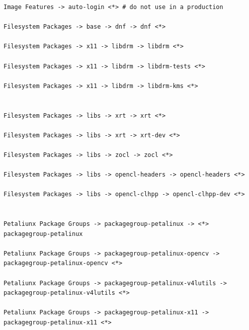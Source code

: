 \documentclass[a4paper, twoside, 11pt]{article}
\newcommand{\fbar}{\FloatBarrier}
\begin{document}
\begin{lstlisting}[language={Text}, caption={Doporučené nastavení rootfs pro akcelerovanou aplikaci.}, label= {lst:petalinux-config-c-rootfs-settings}]
Image Features -> auto-login <*> # do not use in a production

Filesystem Packages -> base -> dnf -> dnf <*>

Filesystem Packages -> x11 -> libdrm -> libdrm <*>

Filesystem Packages -> x11 -> libdrm -> libdrm-tests <*>

Filesystem Packages -> x11 -> libdrm -> libdrm-kms <*>


Filesystem Packages -> libs -> xrt -> xrt <*>

Filesystem Packages -> libs -> xrt -> xrt-dev <*>

Filesystem Packages -> libs -> zocl -> zocl <*>

Filesystem Packages -> libs -> opencl-headers -> opencl-headers <*>

Filesystem Packages -> libs -> opencl-clhpp -> opencl-clhpp-dev <*>


Petaliunx Package Groups -> packagegroup-petalinux -> <*> packagegroup-petalinux

Petaliunx Package Groups -> packagegroup-petalinux-opencv -> packagegroup-petalinux-opencv <*>

Petaliunx Package Groups -> packagegroup-petalinux-v4lutils -> packagegroup-petalinux-v4lutils <*>

Petaliunx Package Groups -> packagegroup-petalinux-x11 -> packagegroup-petalinux-x11 <*>\end{lstlisting}
	
	\fbar
\end{document}
